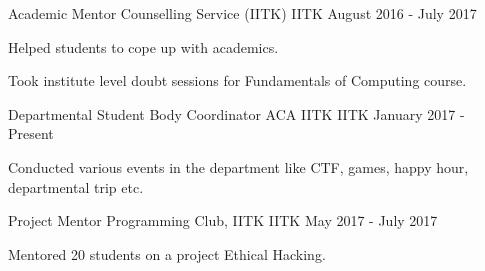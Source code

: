 \documentclass[12pt, a4paper]{awesome-cv}
\begin{document}
\begin{cventries}

  \cventry
    {Academic Mentor}
    {Counselling Service (IITK)}
    {IITK}
    {August 2016 - July 2017}
    {
      \begin{cvitems}
        \item {Helped students to cope up with academics.}
        \item {Took institute level doubt sessions for Fundamentals of Computing course.}
      \end{cvitems}
    }
    \vspace{0.2cm}
  \cventry
  {Departmental Student Body Coordinator}
  {ACA IITK}
  {IITK}
  {January 2017 - Present}
  {
    \begin{cvitems}
    \item Conducted various events in the department like CTF, games, happy hour, departmental trip etc.
    \end{cvitems}
  }
    \vspace{0.2cm}
  \cventry
  {Project Mentor}
  {Programming Club, IITK}
  {IITK}
  {May 2017 - July 2017}
  {
    \begin{cvitems}
    \item Mentored 20 students on a project Ethical Hacking.
    \end{cvitems}
  }
\end{cventries}

\end{document}
